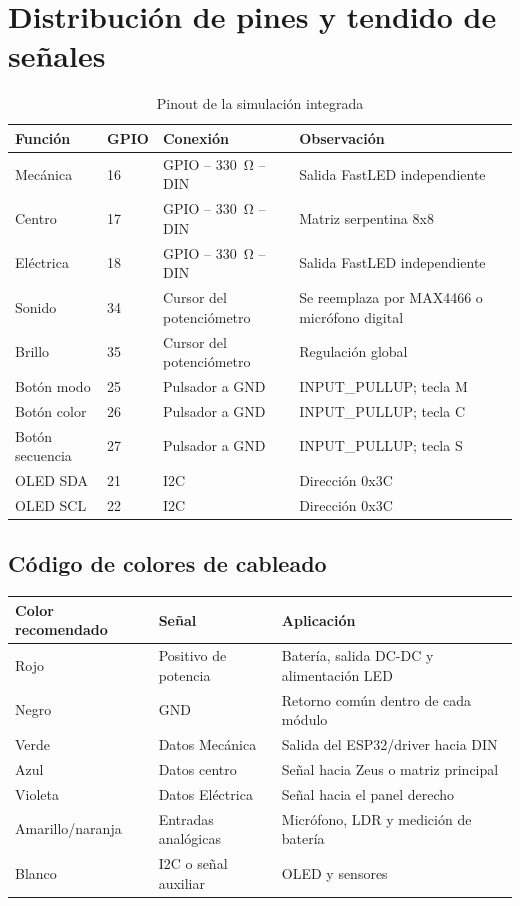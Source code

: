 \documentclass[11pt,a4paper]{article}
\begin{document}
\section{Distribución de pines y tendido de señales}
\begin{table}[H]
\centering
\caption{Pinout de la simulación integrada}
\begin{tabularx}{\textwidth}{@{}P{3.1cm}P{2.0cm}Y P{3.4cm}@{}}
\toprule
\textbf{Función} & \textbf{GPIO} & \textbf{Conexión} & \textbf{Observación}\\
\midrule
Mecánica & 16 & GPIO -- \SI{330}{\ohm} -- DIN & Salida FastLED independiente\\
Centro & 17 & GPIO -- \SI{330}{\ohm} -- DIN & Matriz serpentina 8x8\\
Eléctrica & 18 & GPIO -- \SI{330}{\ohm} -- DIN & Salida FastLED independiente\\
Sonido & 34 & Cursor del potenciómetro & Se reemplaza por MAX4466 o micrófono digital\\
Brillo & 35 & Cursor del potenciómetro & Regulación global\\
Botón modo & 25 & Pulsador a GND & INPUT\_PULLUP; tecla M\\
Botón color & 26 & Pulsador a GND & INPUT\_PULLUP; tecla C\\
Botón secuencia & 27 & Pulsador a GND & INPUT\_PULLUP; tecla S\\
OLED SDA & 21 & I2C & Dirección 0x3C\\
OLED SCL & 22 & I2C & Dirección 0x3C\\
\bottomrule
\end{tabularx}
\end{table}

\subsection{Código de colores de cableado}
\begin{table}[H]
\centering
\begin{tabularx}{\textwidth}{@{}P{2.5cm}P{3.0cm}Y@{}}
\toprule
\textbf{Color recomendado} & \textbf{Señal} & \textbf{Aplicación}\\
\midrule
Rojo & Positivo de potencia & Batería, salida DC-DC y alimentación LED\\
Negro & GND & Retorno común dentro de cada módulo\\
Verde & Datos Mecánica & Salida del ESP32/driver hacia DIN\\
Azul & Datos centro & Señal hacia Zeus o matriz principal\\
Violeta & Datos Eléctrica & Señal hacia el panel derecho\\
Amarillo/naranja & Entradas analógicas & Micrófono, LDR y medición de batería\\
Blanco & I2C o señal auxiliar & OLED y sensores\\
\bottomrule
\end{tabularx}
\end{table}
\end{document}
